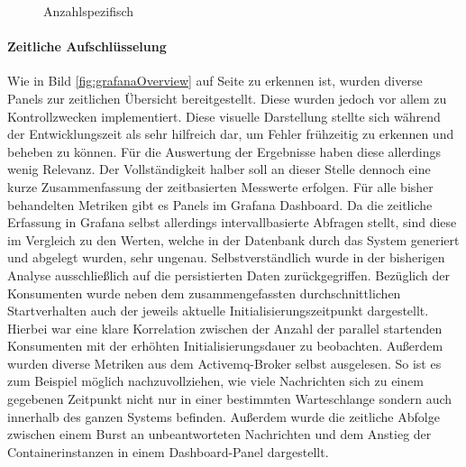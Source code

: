 \begin{figure}[ht!]
  \centering
  \caption[Startzeit Container - Anzahl spezifisch]{Anzahlspezifisch}
  \label{fig:specContainers}
\end{figure}


\paragraph{Zeitliche Aufschlüsselung}
Wie in Bild \ref{fig:grafanaOverview} auf Seite \pageref{fig:grafanaOverview} zu erkennen ist, wurden diverse Panels zur zeitlichen Übersicht bereitgestellt. Diese wurden jedoch vor allem zu Kontrollzwecken implementiert. Diese visuelle Darstellung stellte sich während der Entwicklungszeit als sehr hilfreich dar, um Fehler frühzeitig zu erkennen und beheben zu können. Für die Auswertung der Ergebnisse haben diese allerdings wenig Relevanz. Der Vollständigkeit halber soll an dieser Stelle dennoch eine kurze Zusammenfassung der zeitbasierten Messwerte erfolgen. Für alle bisher behandelten Metriken gibt es Panels im Grafana Dashboard. Da die zeitliche Erfassung in Grafana selbst allerdings intervallbasierte Abfragen stellt, sind diese im Vergleich zu den Werten, welche in der Datenbank durch das System generiert und abgelegt wurden, sehr ungenau. Selbstverständlich wurde in der bisherigen Analyse ausschließlich auf die persistierten Daten zurückgegriffen. Bezüglich der Konsumenten wurde neben dem zusammengefassten durchschnittlichen Startverhalten auch der jeweils aktuelle Initialisierungszeitpunkt dargestellt. Hierbei war eine klare Korrelation zwischen der Anzahl der parallel startenden Konsumenten mit der erhöhten Initialisierungsdauer zu beobachten. Außerdem wurden diverse Metriken aus dem Activemq-Broker selbst ausgelesen. So ist es zum Beispiel möglich nachzuvollziehen, wie viele Nachrichten sich zu einem gegebenen Zeitpunkt nicht nur in einer bestimmten Warteschlange sondern auch innerhalb des ganzen Systems befinden. Außerdem wurde die zeitliche Abfolge zwischen einem Burst an unbeantworteten Nachrichten und dem Anstieg der Containerinstanzen in einem Dashboard-Panel dargestellt.

